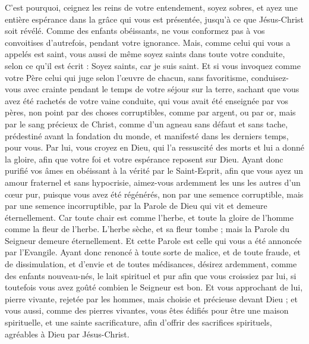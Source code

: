 \begin{multicols}{2}
C'est pourquoi, ceignez les reins de votre entendement, soyez sobres, et ayez une entière espérance dans la grâce qui vous est présentée, jusqu'à ce que Jésus-Christ soit révélé.
Comme des enfants obéissants, ne vous conformez pas à vos convoitises d'autrefois, pendant votre ignorance. 
Mais, comme celui qui vous a appelés est saint, vous aussi de même soyez saints dans toute votre conduite,
selon ce qu'il est écrit : Soyez saints, car je suis saint.
Et si vous invoquez comme votre Père celui qui juge selon l'œuvre de chacun, sans favoritisme, conduisez-vous avec crainte pendant le temps de votre séjour sur la terre,
sachant que vous avez été rachetés de votre vaine conduite, qui vous avait été enseignée par vos pères, non point par des choses corruptibles, comme par argent, ou par or,
mais par le sang précieux de Christ, comme d'un agneau sans défaut et sans tache,
prédestiné avant la fondation du monde, et manifesté dans les derniers temps, pour vous.
Par lui, vous croyez en Dieu, qui l'a ressuscité des morts et lui a donné la gloire, afin que votre foi et votre espérance reposent sur Dieu.
Ayant donc purifié vos âmes en obéissant à la vérité par le Saint-Esprit, afin que vous ayez un amour fraternel et sans hypocrisie, aimez-vous ardemment les uns les autres d'un cœur pur,
puisque vous avez été régénérés, non par une semence corruptible, mais par une semence incorruptible, par la Parole de Dieu qui vit et demeure éternellement.
Car toute chair est comme l'herbe, et toute la gloire de l'homme comme la fleur de l'herbe. L'herbe sèche, et sa fleur tombe ;
mais la Parole du Seigneur demeure éternellement. Et cette Parole est celle qui vous a été annoncée par l'Evangile.
\VerseOne{}Ayant donc renoncé à toute sorte de malice, et de toute fraude, et de dissimulation, et d'envie et de toutes médisances,
désirez ardemment, comme des enfants nouveau-nés, le lait spirituel et pur afin que vous croissiez par lui,
si toutefois vous avez goûté combien le Seigneur est bon.
Et vous approchant de lui, pierre vivante, rejetée par les hommes, mais choisie et précieuse devant Dieu ;
 et vous aussi, comme des pierres vivantes, vous êtes édifiés pour être une maison spirituelle, et une sainte sacrificature, afin d'offrir des sacrifices spirituels, agréables à Dieu par Jésus-Christ. 

\end{multicols}
